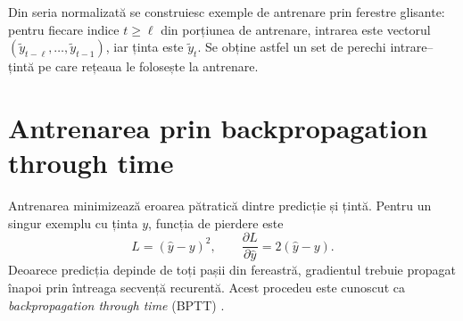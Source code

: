 Din seria normalizată se construiesc exemple de antrenare prin ferestre
glisante: pentru fiecare indice $t \ge \ell$ din porțiunea de antrenare,
intrarea este vectorul $(\tilde{y}_{t-\ell}, \ldots, \tilde{y}_{t-1})$, iar
ținta este $\tilde{y}_t$. Se obține astfel un set de perechi intrare--țintă pe
care rețeaua le folosește la antrenare.

\section{Antrenarea prin backpropagation through time}
\label{sec:bptt_lstm}

Antrenarea minimizează eroarea pătratică dintre predicție și țintă. Pentru un
singur exemplu cu ținta $y$, funcția de pierdere este
\begin{equation}
\label{eq:loss_lstm}
L = \left(\hat{y} - y\right)^2,
\qquad
\frac{\partial L}{\partial \hat{y}} = 2\left(\hat{y} - y\right).
\end{equation}
Deoarece predicția depinde de toți pașii din fereastră, gradientul trebuie
propagat înapoi prin întreaga secvență recurentă. Acest procedeu este cunoscut
ca \emph{backpropagation through time} (BPTT) \cite{werbos1990bptt}.

